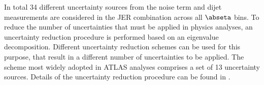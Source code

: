 In total 34 different uncertainty sources from the noise term and dijet measurements are considered in the JER combination across all $\abseta$ bins. To reduce the number of uncertainties that must be applied in physics analyses, an uncertainty reduction procedure is performed based on an eigenvalue decomposition. 
Different uncertainty reduction schemes can be used for this purpose, that result in a different number of uncertainties to be applied.
The scheme most widely adopted in \RunTwo ATLAS analyses comprises a set of 13 uncertainty sources.
Details of the uncertainty reduction procedure can be found in .







